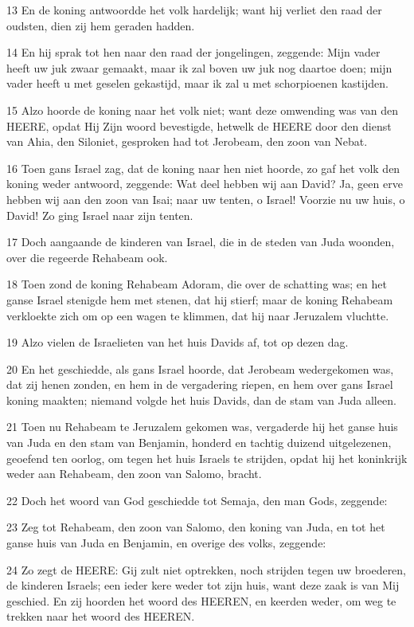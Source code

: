 \par 13 En de koning antwoordde het volk hardelijk; want hij verliet den raad der oudsten, dien zij hem geraden hadden.
\par 14 En hij sprak tot hen naar den raad der jongelingen, zeggende: Mijn vader heeft uw juk zwaar gemaakt, maar ik zal boven uw juk nog daartoe doen; mijn vader heeft u met geselen gekastijd, maar ik zal u met schorpioenen kastijden.
\par 15 Alzo hoorde de koning naar het volk niet; want deze omwending was van den HEERE, opdat Hij Zijn woord bevestigde, hetwelk de HEERE door den dienst van Ahia, den Siloniet, gesproken had tot Jerobeam, den zoon van Nebat.
\par 16 Toen gans Israel zag, dat de koning naar hen niet hoorde, zo gaf het volk den koning weder antwoord, zeggende: Wat deel hebben wij aan David? Ja, geen erve hebben wij aan den zoon van Isai; naar uw tenten, o Israel! Voorzie nu uw huis, o David! Zo ging Israel naar zijn tenten.
\par 17 Doch aangaande de kinderen van Israel, die in de steden van Juda woonden, over die regeerde Rehabeam ook.
\par 18 Toen zond de koning Rehabeam Adoram, die over de schatting was; en het ganse Israel stenigde hem met stenen, dat hij stierf; maar de koning Rehabeam verkloekte zich om op een wagen te klimmen, dat hij naar Jeruzalem vluchtte.
\par 19 Alzo vielen de Israelieten van het huis Davids af, tot op dezen dag.
\par 20 En het geschiedde, als gans Israel hoorde, dat Jerobeam wedergekomen was, dat zij henen zonden, en hem in de vergadering riepen, en hem over gans Israel koning maakten; niemand volgde het huis Davids, dan de stam van Juda alleen.
\par 21 Toen nu Rehabeam te Jeruzalem gekomen was, vergaderde hij het ganse huis van Juda en den stam van Benjamin, honderd en tachtig duizend uitgelezenen, geoefend ten oorlog, om tegen het huis Israels te strijden, opdat hij het koninkrijk weder aan Rehabeam, den zoon van Salomo, bracht.
\par 22 Doch het woord van God geschiedde tot Semaja, den man Gods, zeggende:
\par 23 Zeg tot Rehabeam, den zoon van Salomo, den koning van Juda, en tot het ganse huis van Juda en Benjamin, en overige des volks, zeggende:
\par 24 Zo zegt de HEERE: Gij zult niet optrekken, noch strijden tegen uw broederen, de kinderen Israels; een ieder kere weder tot zijn huis, want deze zaak is van Mij geschied. En zij hoorden het woord des HEEREN, en keerden weder, om weg te trekken naar het woord des HEEREN.
